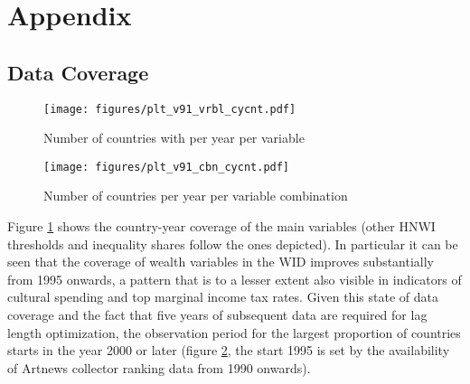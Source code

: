 \documentclass[11pt]{article}
\begin{document}
\clearpage
\FloatBarrier


\section*{Appendix}


\appendix
\setcounter{page}{1}


\renewcommand{\thesubsection}{\Alph{subsection}}



\subsection{Data Coverage}
\label{app_data_coverage}
\begin{figure}[htbp]
\centering
\texttt{[image: figures/plt\_v91\_vrbl\_cycnt.pdf]}
\caption{\label{fig:vrbl_cycnt}Number of countries with per year per variable}
\end{figure}



\begin{figure}[htbp]
\centering
\texttt{[image: figures/plt\_v91\_cbn\_cycnt.pdf]}
\caption{\label{fig:cbn_cycnt}Number of countries per year per variable combination}
\end{figure}



Figure \ref{fig:vrbl_cycnt} shows the country-year coverage of the main variables (other HNWI thresholds and inequality shares follow the ones depicted).
In particular it can be seen that the coverage of wealth variables in the WID improves substantially from 1995 onwards, a pattern that is to a lesser extent also visible in indicators of cultural spending and top marginal income tax rates.
Given this state of data coverage and the fact that five years of subsequent data are required for lag length optimization, the observation period for the largest proportion of countries starts in the year 2000 or later  (figure \ref{fig:cbn_cycnt}, the start 1995 is set by the availability of Artnews collector ranking data from 1990 onwards).
\end{document}
